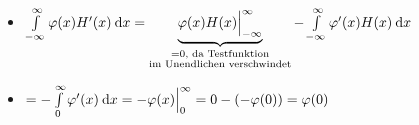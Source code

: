 \begin{itemize}
	\item $\int\limits_{-\infty}^\infty \varphi(x) H'(x) \:\mathrm{d}{x} = \underbrace{\varphi(x)H(x) \Big|_{-\infty}^\infty}_{\substack{=0\text{, da Testfunktion} \\ \text{im Unendlichen verschwindet}}} - \int\limits_{-\infty}^\infty \varphi'(x)H(x) \:\mathrm{d}{x}$
	\item $ = -\int\limits_0^\infty \varphi'(x) \:\mathrm{d}{x} = -\varphi(x)\Big|_0^\infty = 0-(-\varphi(0)) = \varphi(0)$
\end{itemize}
